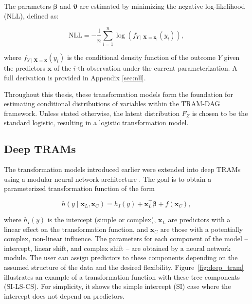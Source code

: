 The parameters $\boldsymbol{\beta}$ and $\boldsymbol{\vartheta}$ are estimated by minimizing the negative log-likelihood (NLL), defined as:


\begin{equation}
\text{NLL} = - \frac{1}{n} \sum_{i=1}^{n} \log \left(f_{Y \mid \mathbf{X} = \mathbf{x}_i}(y_i)\right),
\label{eq:nll_tram}
\end{equation}

where $f_{Y \mid \mathbf{X} = \mathbf{x}}(y_i)$ is the conditional density function of the outcome $Y$ given the predictors $\mathbf{x}$ of the $i$-th observation under the current parameterization. A full derivation is provided in Appendix \ref{sec:nll}.

Throughout this thesis, these transformation models form the foundation for estimating conditional distributions of variables within the TRAM-DAG framework. Unless stated otherwise, the latent distribution $F_Z$ is chosen to be the standard logistic, resulting in a logistic transformation model.



\subsection{Deep TRAMs} \label{sec:deep_trams}

The transformation models introduced earlier were extended into deep TRAMs using a modular neural network architecture \citep{sick2020}. The goal is to obtain a parameterized transformation function of the form

\begin{equation}
h(y \mid \mathbf{x}_L, \mathbf{x}_C ) = h_I(y) + \mathbf{x}_L^\top \boldsymbol{\beta} + f(\mathbf{x}_C),
\label{eq:deep_tram_old}
\end{equation}

where $h_I(y)$ is the intercept (simple or complex), $\mathbf{x}_{L}$ are predictors with a linear effect on the transformation function, and $\mathbf{x}_{C}$ are those with a potentially complex, non-linear influence. The parameters for each component of the model -- intercept, linear shift, and complex shift -- are obtained by a neural network module. The user can assign predictors to these components depending on the assumed structure of the data and the desired flexibility. Figure~\ref{fig:deep_tram} illustrates an example of a transformation function with these tree components (SI-LS-CS). For simplicity, it shows the simple intercept (SI) case where the intercept does not depend on predictors.


